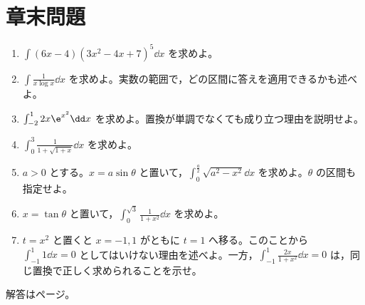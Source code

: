 \section*{章末問題}
\begin{enumerate}[label=\textbf{\thechapter.\arabic*},leftmargin=*]
 \item\label{問:置換べき} $\int(6x-4)(3x^2-4x+7)^5\dd x$ を求めよ。
 \item\label{問:置換二重対数} $\int\frac1{x\log x}\dd x$ を求めよ。実数の範囲で，どの区間に答えを適用できるかも述べよ。
 \item\label{問:置換非単調} $\int_{-2}^1 2x\e^{x^2}\dd x$ を求めよ。置換が単調でなくても成り立つ理由を説明せよ。
 \item\label{問:置換根号分母} $\int_0^3\frac1{1+\sqrt{1+x}}\dd x$ を求めよ。
 \item\label{問:置換円弧} $a>0$ とする。$x=a\sin\theta$ と置いて，$\int_0^{\frac a2}\sqrt{a^2-x^2}\dd x$ を求めよ。$\theta$ の区間も指定せよ。
 \item\label{問:置換正接} $x=\tan\theta$ と置いて，$\int_0^{\sqrt3}\frac1{1+x^2}\dd x$ を求めよ。
 \item\label{問:置換枝の違い} $t=x^2$ と置くと $x=-1,1$ がともに $t=1$ へ移る。このことから $\int_{-1}^1 1\dd x=0$ としてはいけない理由を述べよ。一方，$\int_{-1}^1\frac{2x}{1+x^2}\dd x=0$ は，同じ置換で正しく求められることを示せ。
\end{enumerate}

\smallskip\noindent 解答は\pageref{解答:第5章}ページ。
